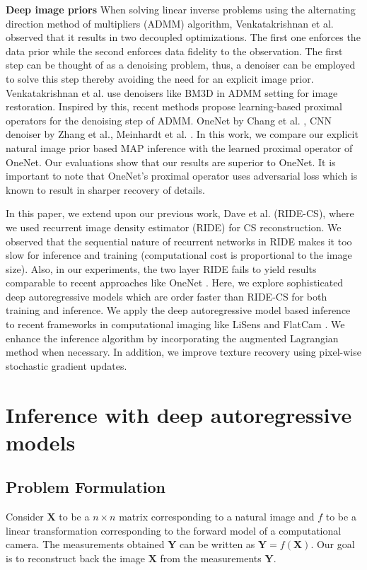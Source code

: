 \documentclass[journal,twoside]{IEEEtran}
\newcommand{\X}{\mathbf{X}}
\newcommand{\Y}{\mathbf{Y}}
\begin{document}
\textbf{Deep image priors} When solving linear inverse problems using the alternating direction method of multipliers (ADMM) algorithm, Venkatakrishnan et al. \cite{venkatakrishnan2013plug} observed that it results in two decoupled optimizations. The first one enforces the data prior while the second enforces data fidelity to the observation. The first step can be thought of as a denoising problem, thus, a denoiser can be employed to solve this step thereby avoiding the need for an explicit image prior. Venkatakrishnan et al. \cite{venkatakrishnan2013plug} use denoisers like BM3D \cite{dabov2009bm3d} in ADMM setting for image restoration. Inspired by this, recent methods propose learning-based proximal operators for the denoising step of ADMM. OneNet by Chang et al. \cite{chang2017one}, CNN denoiser by Zhang et al.\cite{zhang2017learning}, Meinhardt et al.  \cite{meinhardt2017learning} . In this work, we compare our explicit natural image prior based MAP inference with the learned proximal operator of OneNet. Our evaluations show that our results are superior to OneNet. It is important to note that OneNet's proximal operator uses adversarial loss \cite{goodfellow2014generative} which is known to result in sharper recovery of details.

In this paper, we extend upon our previous work, Dave et al. \cite{dave2017compressive} (RIDE-CS), where we used recurrent image density estimator (RIDE) for CS reconstruction. We observed that the sequential nature of recurrent networks in RIDE makes it too slow for inference and training (computational cost is proportional to the image size). Also, in our experiments, the two layer RIDE fails to yield results comparable to recent approaches like OneNet \cite{chang2017one}. Here, we explore sophisticated deep autoregressive models which are order faster than RIDE-CS for both training and inference. We apply the deep autoregressive model based inference to recent frameworks in computational imaging like LiSens \cite{wang2015lisens} and FlatCam \cite{asif2017flatcam}. We enhance the inference algorithm by incorporating the augmented Lagrangian method when necessary. 
In addition, we improve texture recovery using pixel-wise stochastic gradient updates.  


\section{Inference with deep autoregressive models}

\subsection{Problem Formulation}
Consider $\X$ to be a $n\times n$ matrix corresponding to a natural image and $f$ to be a linear transformation corresponding to the forward model of a computational camera. The measurements obtained $\Y$ can be written as $\Y = f(\X)$. Our goal is to reconstruct back the image $\X$ from the measurements $\Y$. 
\end{document}
